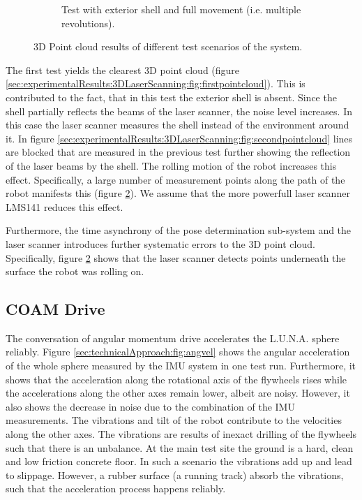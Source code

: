 \begin{figure}
\begin{subfigure}[b]{\textwidth}
	\caption{Test with exterior shell and full movement (i.e. multiple revolutions).}
	\label{sec:experimentalResults:3DLaserScanning:fig:thirdpointcloud}
\end{subfigure}
\caption{3D Point cloud results of different test scenarios of the system.}
\end{figure}

The first test yields the clearest 3D point cloud (figure \ref{sec:experimentalResults:3DLaserScanning:fig:firstpointcloud}).
This is contributed to the fact, that in this test the exterior shell is absent.
Since the shell partially reflects the beams of the laser scanner, the noise level increases.
In this case the laser scanner measures the shell instead of the environment around it.
In figure \ref{sec:experimentalResults:3DLaserScanning:fig:secondpointcloud} lines are blocked that are measured in the previous test further showing the reflection of the laser beams by the shell.
The rolling motion of the robot increases this effect.
Specifically, a large number of measurement points along the path of the robot manifests this (figure \ref{sec:experimentalResults:3DLaserScanning:fig:thirdpointcloud}).
We assume that the more powerfull laser scanner LMS141 reduces this effect. 

Furthermore, the time asynchrony of the pose determination sub-system and the laser scanner introduces further systematic errors to the 3D point cloud.
Specifically, figure \ref{sec:experimentalResults:3DLaserScanning:fig:thirdpointcloud} shows that the laser scanner detects points underneath the surface the robot was rolling on. 

\subsection{COAM Drive}
\label{sec:experimentalResults:COAMDrive}

The conversation of angular momentum drive accelerates the L.U.N.A. sphere reliably.
Figure \ref{sec:technicalApproach:fig:angvel} shows the angular acceleration of the whole sphere measured by the IMU system in one test run. 
Furthermore, it shows that the acceleration along the rotational axis of the flywheels rises while the accelerations along the other axes remain lower, albeit are noisy. 
However, it also shows the decrease in noise due to the combination of the IMU measurements.
The vibrations and tilt of the robot contribute to the velocities along the other axes.
The vibrations are results of inexact drilling of the flywheels such that there is an unbalance.
At the main test site the ground is a hard, clean and low friction concrete floor.
In such a scenario the vibrations add up and lead to slippage.
However, a rubber surface (a running track) absorb the vibrations, such that the acceleration process happens reliably.
